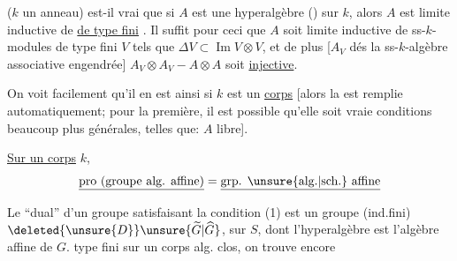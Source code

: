 
($k$ un anneau) est-il vrai que si $A$ est une hyperalgèbre () sur $k$, alors $A$  est limite inductive de  \uline{de type fini} . Il suffit pour ceci que $A$ soit limite inductive de ss-$k$-modules de type fini $V$ tels que $\Delta V\subset\operatorname{Im}V\otimes V$, et de plus [$A_V$ dés la ss-$k$-algèbre associative engendrée]  $A_V\otimes A_V\mathbin{-}A\otimes A$ soit \uline{injective}. 

On voit facilement qu'il en est ainsi si $k$ est un \uline{corps} [alors la   est remplie automatiquement; pour la première, il est possible qu'elle soit vraie   conditions beaucoup plus générales, telles que: $A$ libre].
\margin{$\unsure{\ast|+}$}

\uline{Sur un corps} $k$, 
\[
\underline{\text{pro (groupe alg. affine)}}=\underline{\text{grp. \unsure{alg.|sch.} affine}}
\]

Le ``dual'' d'un  groupe  satisfaisant la condition (1) est un groupe (ind.fini) $\deleted{\unsure{D}}\unsure{\widetilde G|\widehat G}$, sur $S$, dont l'hyperalgèbre est l'algèbre affine de $G$.  type fini sur un corps alg. clos, on trouve encore
